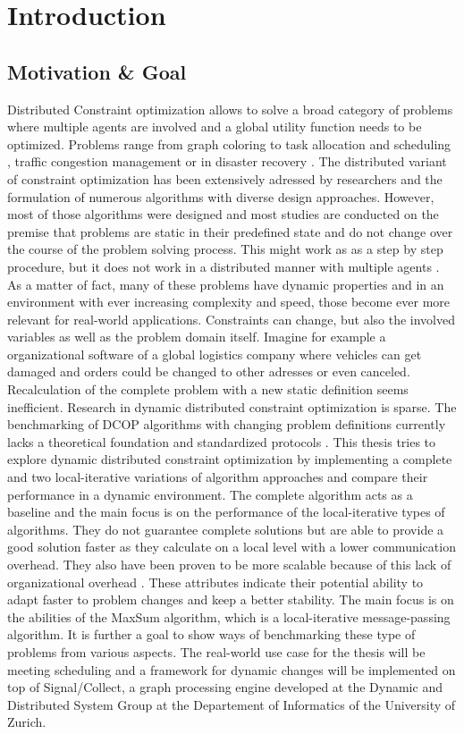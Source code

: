 \chapter{Introduction}

\section{Motivation \& Goal}
Distributed Constraint optimization allows to solve a broad category of problems where multiple agents are involved and a global utility function needs to be optimized. Problems range from graph coloring \cite{Modi2005} to task allocation and scheduling \cite{Zhang}, traffic congestion management \cite{Leeuwen2002} or in disaster recovery \cite{J1999}. The distributed variant of constraint optimization has been extensively adressed by researchers and the formulation of numerous algorithms with diverse design approaches. However, most of those algorithms were designed and most studies are conducted on the premise that problems are static in their predefined state and do not change over the course of the problem solving process. This might work as as a step by step procedure, but it does not work in a distributed manner with multiple agents \cite{Petcua}. As a matter of fact, many of these problems have dynamic properties and in an environment with ever increasing complexity and speed, those become ever more relevant for real-world applications. Constraints can change, but also the involved variables as well as the problem domain itself. Imagine for example a organizational software of a global logistics company where vehicles can get damaged and orders could be changed to other adresses or even canceled. Recalculation of the complete problem with a new  static definition seems inefficient. Research in dynamic distributed constraint optimization is sparse. The benchmarking of DCOP algorithms with changing problem definitions currently lacks a theoretical foundation and standardized protocols \cite{Maillera}. 
\newline \newline
This thesis tries to explore dynamic distributed constraint optimization by implementing a complete and two local-iterative variations of algorithm approaches and compare their performance in a dynamic environment. The complete algorithm acts as a baseline and the main focus is on the performance of the local-iterative types of algorithms. They do not guarantee complete solutions but are able to provide a good solution faster as they calculate on a local level with a lower communication overhead. They also have been proven to be more scalable because of this lack of organizational overhead \cite{Chapman2011}. These attributes indicate their potential ability to adapt faster to problem changes and keep a better stability. The main focus is on the abilities of the MaxSum algorithm, which is a local-iterative message-passing algorithm. It is further a goal to show ways of benchmarking these type of problems from various aspects. The real-world use case for the thesis will be meeting scheduling and a framework for dynamic changes will be implemented on top of Signal/Collect, a graph processing engine developed at  the Dynamic and Distributed System Group at the Departement of Informatics of the University of Zurich.
